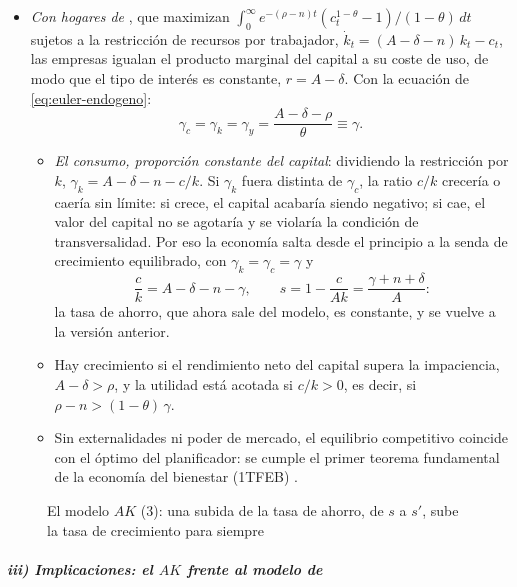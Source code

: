\documentclass[11pt]{article}
\begin{document}
\begin{itemize}
\item \emph{Con hogares de }, que maximizan $\int_0^{\infty}e^{-(\rho-n)t}(c_t^{1-\theta}-1)/(1-\theta)\,dt$ sujetos a la restricción de recursos por trabajador, $\dot k_t=(A-\delta-n)\,k_t-c_t$, las empresas igualan el producto marginal del capital a su coste de uso, de modo que el tipo de interés es constante, $r=A-\delta$. Con la ecuación de  \eqref{eq:euler-endogeno}:
  \begin{equation}
  \gamma_c=\gamma_k=\gamma_y=\frac{A-\delta-\rho}{\theta}\equiv\gamma.\label{eq:ak-ramsey}
  \end{equation}
  \begin{itemize}
  \item \emph{El consumo, proporción constante del capital}: dividiendo la restricción por $k$, $\gamma_k=A-\delta-n-c/k$. Si $\gamma_k$ fuera distinta de $\gamma_c$, la ratio $c/k$ crecería o caería sin límite: si crece, el capital acabaría siendo negativo; si cae, el valor del capital no se agotaría y se violaría la condición de transversalidad. Por eso la economía salta desde el principio a la senda de crecimiento equilibrado, con $\gamma_k=\gamma_c=\gamma$ y
  \[\frac{c}{k}=A-\delta-n-\gamma,\qquad s=1-\frac{c}{Ak}=\frac{\gamma+n+\delta}{A}:\]
  la tasa de ahorro, que ahora sale del modelo, es constante, y se vuelve a la versión anterior.
  \item Hay crecimiento si el rendimiento neto del capital supera la impaciencia, $A-\delta>\rho$, y la utilidad está acotada si $c/k>0$, es decir, si $\rho-n>(1-\theta)\,\gamma$.
  \item Sin externalidades ni poder de mercado, el equilibrio competitivo coincide con el óptimo del planificador: se cumple el primer teorema fundamental de la economía del bienestar (1TFEB) .
  \end{itemize}
\end{itemize}

\begin{figure}[H]
\centering
\caption{El modelo $AK$ (3): una subida de la tasa de ahorro, de $s$ a $s'$, sube la tasa de crecimiento para siempre}\label{fig:tasas-endogeno}
\end{figure}

\subparagraph{iii) Implicaciones: el $AK$ frente al modelo de }
\end{document}
